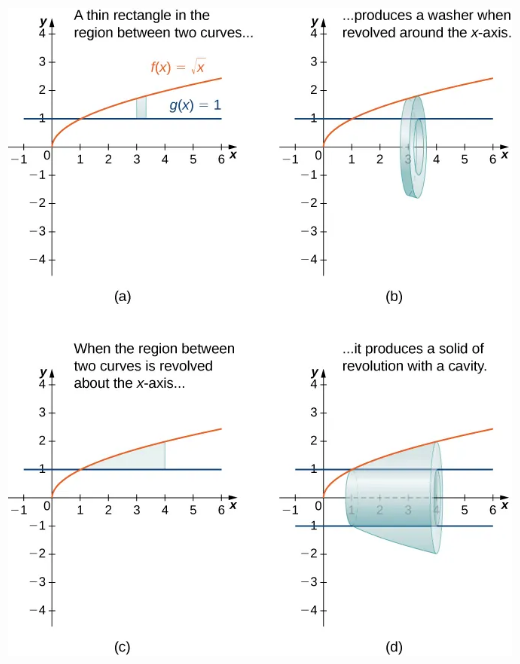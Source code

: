 \documentclass{report}
\begin{document}
    \begin{minipage}{0.5\textwidth}
        \begin{center}
            \includegraphics[scale=0.35]{./figures/graph24.png}
        \end{center}
    \end{minipage}
\end{document}
